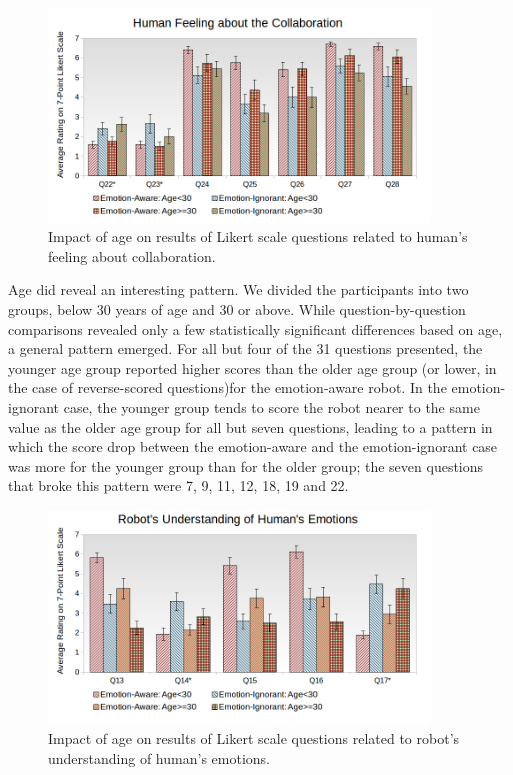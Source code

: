 \documentclass[12pt]{report}
\begin{document}
\begin{figure}[tbh]
\centering
\includegraphics[width=0.9\textwidth]{figure/Age-Collaboration.png}
\vspace*{-5mm}
\caption{\fontsize{10pt}{10pt}\selectfont Impact of age on results of Likert
scale questions related to human's feeling about collaboration.}
\label{fig:age-collaboration}
\end{figure}

Age did reveal an interesting pattern. We divided the participants into two
groups, below 30 years of age and 30 or above. While question-by-question
comparisons revealed only a few statistically significant differences based on
age, a general pattern emerged. For all but four of the 31 questions presented,
the younger age group reported higher scores than the older age group (or lower,
in the case of reverse-scored questions)for the emotion-aware robot. In the
emotion-ignorant case, the younger group tends to score the robot nearer to
the same value as the older age group for all but seven questions, leading to a
pattern in which the score drop between the emotion-aware and the
emotion-ignorant case was more for the younger group than for the older group;
the seven questions that broke this pattern were 7, 9, 11, 12, 18, 19 and 22.

\begin{figure}[!h]
\centering
\includegraphics[width=0.9\textwidth]{figure/Age-Emotions.png}
\vspace*{-5mm}
\caption{\fontsize{10pt}{10pt}\selectfont Impact of age on results of Likert
scale questions related to robot's understanding of human's emotions.}
\label{fig:age-emotions}
\end{figure}
\end{document}
